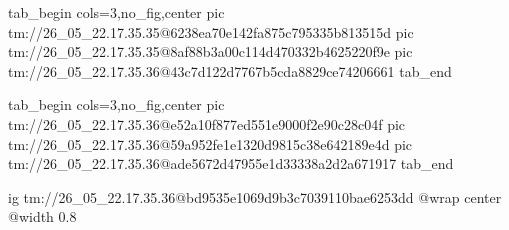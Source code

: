  
 
 
 
 

\qqSecCmtScr


\ifcmt
  tab_begin cols=3,no_fig,center
    pic tm://26_05_22.17.35.35@6238ea70e142fa875c795335b813515d
    pic tm://26_05_22.17.35.35@8af88b3a00c114d470332b4625220f9e
    pic tm://26_05_22.17.35.36@43c7d122d7767b5cda8829ce74206661
  tab_end
\fi


\ifcmt
  tab_begin cols=3,no_fig,center
    pic tm://26_05_22.17.35.36@e52a10f877ed551e9000f2e90c28c04f
    pic tm://26_05_22.17.35.36@59a952fe1e1320d9815c38e642189e4d
    pic tm://26_05_22.17.35.36@ade5672d47955e1d33338a2d2a671917
  tab_end
\fi


\ifcmt
  ig tm://26_05_22.17.35.36@bd9535e1069d9b3c7039110bae6253dd
  @wrap center
  @width 0.8
\fi

